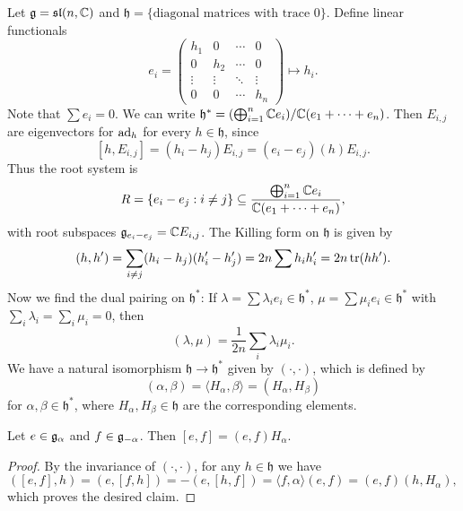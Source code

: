 \begin{example}
  Let $\mathfrak{g} = \mathfrak{sl}(n, \mathbb{C})$
  and $\mathfrak{h} = \{\text{diagonal matrices with trace $0$}\}$.
  Define linear functionals
  \[
    e_i =
    \begin{pmatrix}
      h_1 & 0 & \cdots & 0 \\
      0 & h_2 & \cdots & 0 \\
      \vdots & \vdots & \ddots & \vdots \\
      0 & 0 & \cdots & h_n
    \end{pmatrix}
    \longmapsto h_i.
  \]
  Note that $\sum e_i = 0$. We can write
  $\mathfrak{h}^* = (\bigoplus_{i = 1}^n \mathbb{C} e_i) / \mathbb{C}(e_1 + \dots + e_n)$.
  Then $E_{i, j}$ are eigenvectors
  for $\operatorname{ad}_h$ for every $h \in \mathfrak{h}$,
  since
  \[
    [h, E_{i, j}]
    = (h_i - h_j) E_{i, j}
    = (e_i - e_j)(h) E_{i, j}.
  \]
  Thus the root system is
  \[
    R = \{e_i - e_j : i \ne j\}
    \subseteq \frac{\bigoplus_{i = 1}^n \mathbb{C} e_i}
    {\mathbb{C}(e_1 + \dots + e_n)},
  \]
  with root subspaces
  $\mathfrak{g}_{e_i - e_j} = \mathbb{C} E_{i, j}$. The
  Killing form on $\mathfrak{h}$ is given by
  \[
    (h, h')
    = \sum_{i \ne j} (h_i - h_j) (h_i' - h_j')
    = 2n \sum h_i h_i'
    = 2n \operatorname{tr}(h h').
  \]
  Now we find the
  dual pairing on $\mathfrak{h}^*$:
  If $\lambda = \sum \lambda_i e_i \in \mathfrak{h}^*$, $\mu = \sum \mu_i e_i \in \mathfrak{h}^*$
  with $\sum_i \lambda_i = \sum_i \mu_i = 0$, then
  \[
    (\lambda, \mu)
    = \frac{1}{2n} \sum_i \lambda_i \mu_i.
  \]
  We have a natural isomorphism
  $\mathfrak{h} \to \mathfrak{h}^*$ given by
  $(\cdot, \cdot)$, which is defined by
  \[
    (\alpha, \beta)
    = \langle H_\alpha, \beta \rangle
    = (H_\alpha, H_\beta)
  \]
  for $\alpha, \beta \in \mathfrak{h}^*$,
  where $H_\alpha, H_\beta \in \mathfrak{h}$
  are the corresponding elements.
\end{example}

\begin{lemma}\label{lem:root-commutator}
  Let $e \in \mathfrak{g}_\alpha$ and
  $f \in \mathfrak{g}_{-\alpha}$. Then
  $[e, f] = (e, f) H_\alpha$.
\end{lemma}

\begin{proof}
  By the invariance of $(\cdot, \cdot)$, for any $h \in \mathfrak{h}$
  we have
  \[
    ([e, f], h)
    = (e, [f, h])
    = -(e, [h, f])
    = \langle f, \alpha \rangle (e, f)
    = (e, f) (h, H_\alpha),
  \]
  which proves the desired claim.
\end{proof}
